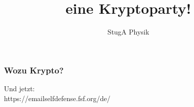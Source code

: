 \documentclass[12pt]{beamer}
\author{StugA Physik}
\title[Kryptoparty]{eine Kryptoparty!}
\begin{document}
\begin{frame}
    \titlepage
\end{frame}


\begin{frame}
    \frametitle{Wozu Krypto?}
\end{frame}



\begin{frame}
    Und jetzt:\\
    \LARGE{https://emailselfdefense.fsf.org/de/}
\end{frame}
\end{document}
